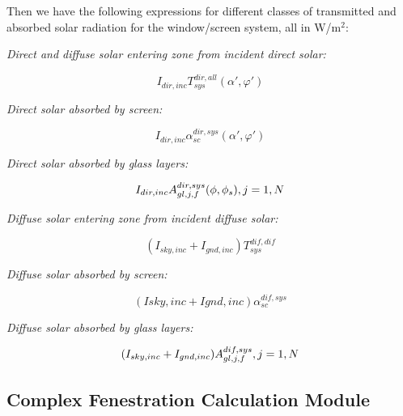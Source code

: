 Then we have the following expressions for different classes of transmitted and absorbed solar radiation for the window/screen system, all in W/m\(^{2}\):

\emph{Direct and diffuse solar entering zone from incident direct solar:}

\begin{equation}
{I_{dir,inc}}T_{sys}^{dir,all}\left( {\alpha ',\varphi '} \right)
\end{equation}

\emph{Direct solar absorbed by screen:}

\begin{equation}
{I_{dir,inc}}\alpha_{sc}^{dir,sys}\left( {\alpha ',\varphi '} \right)
\end{equation}

\emph{Direct solar absorbed by glass layers:}

\begin{equation}
{I_{dir,inc}}A_{gl,j,f}^{dir,sys}(\phi ,{\phi_s}),{\rm{    }}j = 1,N
\end{equation}

\emph{Diffuse solar entering zone from incident diffuse solar:}

\begin{equation}
\left( {{I_{sky,inc}} + {I_{gnd,inc}}} \right)T_{sys}^{dif,dif}
\end{equation}

\emph{Diffuse solar absorbed by screen:}

\begin{equation}
\left( {Isky,inc + Ignd,inc} \right)\alpha_{sc}^{dif,sys}
\end{equation}

\emph{Diffuse solar absorbed by glass layers:}

\begin{equation}
({I_{sky,inc}} + {I_{gnd,inc}})A_{gl,j,f}^{dif,sys},{\rm{   }}j = 1,N{\rm{ }}
\end{equation}

\subsection{Complex Fenestration Calculation Module}\label{complex-fenestration-calculation-module}

